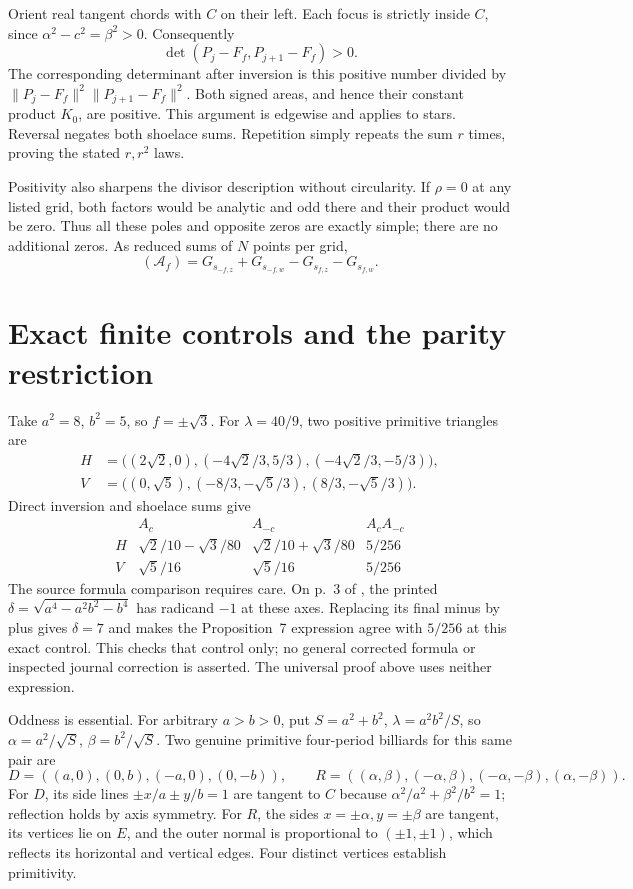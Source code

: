 \documentclass[11pt]{article}
\newcommand{\A}{\mathcal A}
\begin{document}
Orient real tangent chords with \(C\) on their left. Each focus is
strictly inside \(C\), since \(\alpha^2-c^2=\beta^2>0\). Consequently
\[
 \det(P_j-F_f,P_{j+1}-F_f)>0.
\]
The corresponding determinant after inversion is this positive number
divided by
\(\|P_j-F_f\|^2\|P_{j+1}-F_f\|^2\). Both signed areas, and hence
their constant product \(K_0\), are positive. This argument is edgewise
and applies to stars. Reversal negates both shoelace sums. Repetition
simply repeats the sum \(r\) times, proving the stated \(r,r^2\) laws.

Positivity also sharpens the divisor description without circularity.
If \(\rho=0\) at any listed grid, both factors would be analytic and
odd there and their product would be zero. Thus all these poles and
opposite zeros are exactly simple; there are no additional zeros.
As reduced sums of \(N\) points per grid,
\[
 (\A_f)=G_{s_{-f,z}}+G_{s_{-f,w}}-G_{s_{f,z}}-G_{s_{f,w}}.
\]

\section{Exact finite controls and the parity restriction}

Take \(a^2=8\), \(b^2=5\), so \(f=\pm\sqrt3\). For
\(\lambda=40/9\), two positive primitive triangles are
\begin{align*}
 H&=\bigl((2\sqrt2,0),(-4\sqrt2/3,5/3),(-4\sqrt2/3,-5/3)\bigr),\\
 V&=\bigl((0,\sqrt5),(-8/3,-\sqrt5/3),(8/3,-\sqrt5/3)\bigr).
\end{align*}
Direct inversion and shoelace sums give
\[
 \begin{array}{c|cc|c}
 &A_c&A_{-c}&A_cA_{-c}\\ \hline
 H&\sqrt2/10-\sqrt3/80&\sqrt2/10+\sqrt3/80&5/256\\
 V&\sqrt5/16&\sqrt5/16&5/256
 \end{array}
\]
The source formula comparison requires care. On p.~3 of \cite{RGH},
the printed \(\delta=\sqrt{a^4-a^2b^2-b^4}\) has radicand \(-1\) at
these axes. Replacing its final minus by plus gives \(\delta=7\) and
makes the Proposition~7 expression agree with \(5/256\) at this exact
control. This checks that control only; no general corrected formula or
inspected journal correction is asserted. The universal proof above
uses neither expression.

Oddness is essential. For arbitrary \(a>b>0\), put
\(S=a^2+b^2\), \(\lambda=a^2b^2/S\), so
\(\alpha=a^2/\sqrt S\), \(\beta=b^2/\sqrt S\). Two genuine primitive
four-period billiards for this same pair are
\[
 D=((a,0),(0,b),(-a,0),(0,-b)),\qquad
 R=((\alpha,\beta),(-\alpha,\beta),(-\alpha,-\beta),(\alpha,-\beta)).
\]
For \(D\), its side lines \(\pm x/a\pm y/b=1\) are tangent to \(C\)
because \(\alpha^2/a^2+\beta^2/b^2=1\); reflection holds by axis
symmetry. For \(R\), the sides \(x=\pm\alpha,y=\pm\beta\) are
tangent, its vertices lie on \(E\), and the outer normal is proportional
to \((\pm1,\pm1)\), which reflects its horizontal and vertical edges.
Four distinct vertices establish primitivity.
\end{document}
